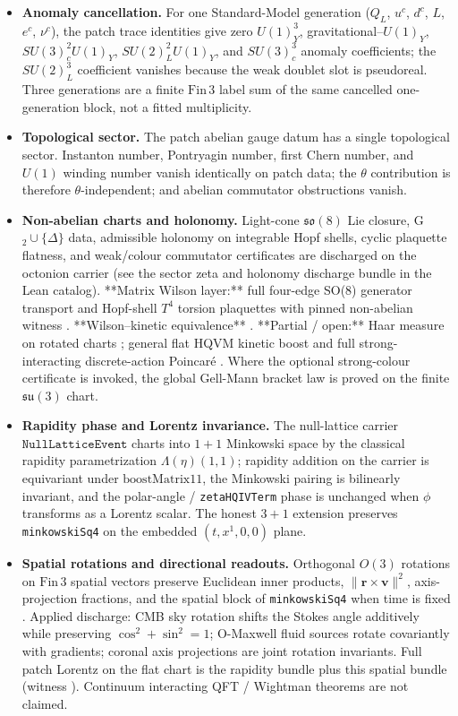 \else
\begin{itemize}[nosep]
\item \textbf{Anomaly cancellation.} For one Standard-Model generation
($Q_L$, $u^c$, $d^c$, $L$, $e^c$, $\nu^c$), the patch trace identities give
zero $U(1)_Y^3$, gravitational--$U(1)_Y$, $SU(3)_c^2U(1)_Y$,
$SU(2)_L^2U(1)_Y$, and $SU(3)_c^3$ anomaly coefficients; the $SU(2)_L^3$
coefficient vanishes because the weak doublet slot is pseudoreal.  Three
generations are a finite $\mathrm{Fin}\,3$ label sum of the same cancelled
one-generation block, not a fitted multiplicity\leanCertAnomaly.
\item \textbf{Topological sector.} The patch abelian gauge datum has a single
topological sector.  Instanton number, Pontryagin number, first Chern number, and
$U(1)$ winding number vanish identically on patch data; the $\theta$ contribution
is therefore $\theta$-independent; and abelian commutator obstructions vanish\leanCertTopology.
\item \textbf{Non-abelian charts and holonomy.} Light-cone $\mathfrak{so}(8)$ Lie
closure, G$_2\cup\{\Delta\}$ data, admissible holonomy on integrable Hopf shells,
cyclic plaquette flatness, and weak/colour commutator certificates are discharged on
the octonion carrier (see the sector zeta and holonomy discharge bundle in the Lean
catalog).  **Matrix Wilson layer:** full four-edge SO(8) generator transport and
Hopf-shell $T^4$ torsion plaquettes with pinned non-abelian witness
\leanPatchHolonomyWitness.  **Wilson--kinetic equivalence**
\leanPatchWilsonKinetic.  **Partial / open:** Haar
measure on rotated charts
\leanPatchHaarMeasure; general flat HQVM kinetic
boost and full strong-interacting discrete-action Poincaré
\leanPatchDiscretePoincare.  Where the optional
strong-colour certificate is invoked, the global Gell-Mann bracket law is proved on
the finite $\mathfrak{su}(3)$ chart\leanCertStrongColor.
\item \textbf{Rapidity phase and Lorentz invariance.} The null-lattice carrier
$\texttt{NullLatticeEvent}$ charts into $1{+}1$ Minkowski space by the classical
rapidity parametrization $\Lambda(\eta)(1,1)$; rapidity addition on the carrier is
equivariant under $\mathrm{boostMatrix11}$, the Minkowski pairing is bilinearly
invariant, and the polar-angle / \texttt{zetaHQIVTerm} phase is unchanged when
$\phi$ transforms as a Lorentz scalar.  The honest $3{+}1$ extension preserves
\texttt{minkowskiSq4} on the embedded $(t,x^1,0,0)$ plane.
\item \textbf{Spatial rotations and directional readouts.} Orthogonal $O(3)$
rotations on $\mathrm{Fin}\,3$ spatial vectors preserve Euclidean inner products,
$\|{\mathbf r}\times{\mathbf v}\|^2$, axis-projection fractions, and the spatial
block of \texttt{minkowskiSq4} when time is fixed
\leanPatchSpatialRotation.  Applied discharge:
CMB sky rotation shifts the Stokes angle additively while preserving
$\cos^2+\sin^2=1$; O-Maxwell fluid sources rotate covariantly with gradients;
coronal axis projections are joint rotation invariants.  Full patch Lorentz on the
flat chart is the rapidity bundle plus this spatial bundle
(witness ).  Continuum interacting QFT /
Wightman theorems are not claimed.
\end{itemize}
\fi

